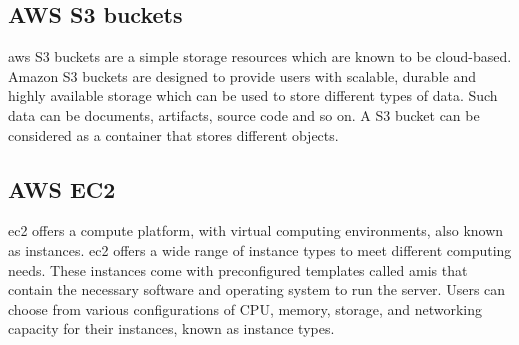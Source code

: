 \subsection{AWS S3 buckets}
\acrshort{aws} S3 buckets are a simple storage resources which are known to be  cloud-based. Amazon S3 buckets are designed to provide users with scalable, durable and highly available storage which can be used to store different types of data. Such data can be documents, artifacts, source code and so on. A S3 bucket can be considered as a container that stores different objects. \cite{S3Bucket}

\subsection{AWS EC2}
\acrlong{ec2} offers a \gls{compute platform}, with virtual computing environments, also known as instances. \acrlong{ec2} offers a wide range  of instance types to meet different computing needs. These instances come with preconfigured templates called \acrlong{amis} that contain the necessary software and operating system to run the server. Users can choose from various configurations of CPU, memory, storage, and networking capacity for their instances, known as instance types.\cite{awsec2}



